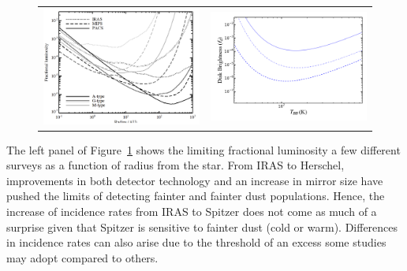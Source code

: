     \begin{figure}
    \centering
    \begin{tabular}{cc}
    \includegraphics[scale=0.2]{Ch2/Detection_limits_Kennedy} &
    \includegraphics[scale=0.3]{Ch2/fd_vs_tbb_simple}
    \end{tabular}
    \caption[]{}
    \label{fig:detection_limits}
    \end{figure}
    
   
   The left panel of Figure~\ref{fig:detection_limits} shows the limiting fractional luminosity a few different surveys as a function of radius from the star. From IRAS to Herschel, improvements in both detector technology and an increase in mirror size have pushed the limits of detecting fainter and fainter dust populations. Hence, the increase of incidence rates from IRAS to Spitzer does not come as much of a surprise given that Spitzer is sensitive to fainter dust (cold or warm). Differences in incidence rates can also arise due to the threshold of an excess some studies may adopt compared to others. 
   
